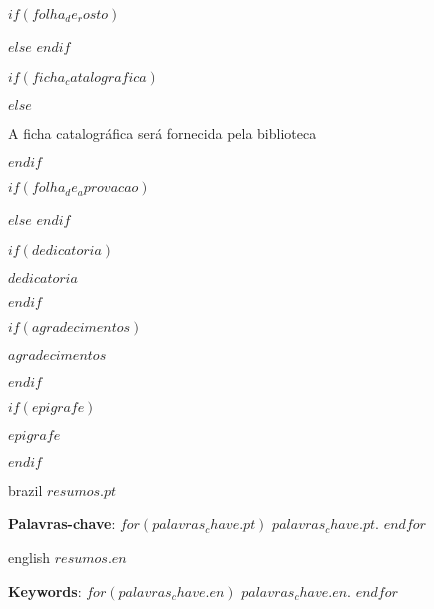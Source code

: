 \documentclass[
	oldfontcommands,
	sumario=abnt-6027-2012,
	12pt,
	openright,
	oneside,
	a4paper,
	english,
	english
	]{imecc-unicamp}
\begin{document}
\frenchspacing

\pretextual
\imprimirprimeirafolha

$if(folha_de_rosto)$
  \begin{folhaderosto}
  
  \end{folhaderosto}
$else$
  \imprimirfolhaderosto
$endif$

\begin{fichacatalografica}
  $if(ficha_catalografica)$
    
  $else$
    \begin{center}
  {\ABNTEXchapterfont\large A ficha catalográfica será fornecida pela biblioteca}
    \end{center}
  $endif$
\end{fichacatalografica}

\begin{folhadeaprovacao}
  $if(folha_de_aprovacao)$
    
  $else$
  $endif$
\end{folhadeaprovacao}

$if(dedicatoria)$
  \begin{dedicatoria}
     \vspace*{\fill}
     \centering
     \noindent
     \textit{
        $dedicatoria$
     }
     \vspace*{\fill}
  \end{dedicatoria}
$endif$

$if(agradecimentos)$
  \begin{agradecimentos}
  $agradecimentos$
  \end{agradecimentos}
$endif$

$if(epigrafe)$
  \begin{epigrafe}
      \vspace*{\fill}
      \begin{flushright}
  	\textit{$epigrafe$}
      \end{flushright}
  \end{epigrafe}
  $endif$

\setlength{\absparsep}{18pt}
\begin{resumo}[Resumo]
 \begin{otherlanguage*}{brazil}
    $resumos.pt$

    \textbf{Palavras-chave}: $for(palavras_chave.pt)$ $palavras_chave.pt$. $endfor$
 \end{otherlanguage*}
\end{resumo}
\begin{resumo}[Abstract]
 \begin{otherlanguage*}{english}
    $resumos.en$

    \textbf{Keywords}: $for(palavras_chave.en)$ $palavras_chave.en$. $endfor$
 \end{otherlanguage*}
\end{resumo}
\end{document}
